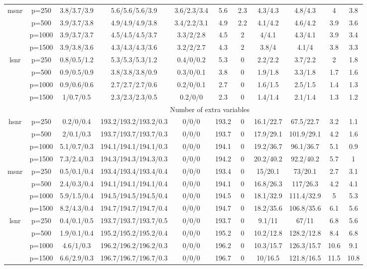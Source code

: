 \begin{table}[ht]
{\begin{tabular}{|c|c|ccccccccc|}
  \midrule\multirow{4}[2]{*}{msnr} & p=250 & 3.8/3.7/3.9 & 5.6/5.6/5.6/3.9 & 3.6/2.3/3.4 & 5.6 & 2.3 & 4.3/4.3 & 4.8/4.3 & 4 & 3.8 \\ 
   & p=500 & 3.9/3.7/3.8 & 4.9/4.9/4.9/3.8 & 3.4/2.2/3.1 & 4.9 & 2.2 & 4.1/4.2 & 4.6/4.2 & 3.9 & 3.6 \\ 
   & p=1000 & 3.9/3.7/3.7 & 4.5/4.5/4.5/3.7 & 3.3/2/2.8 & 4.5 & 2 & 4/4.1 & 4.3/4.1 & 3.9 & 3.4 \\ 
   & p=1500 & 3.9/3.8/3.6 & 4.3/4.3/4.3/3.6 & 3.2/2/2.7 & 4.3 & 2 & 3.8/4 & 4.1/4 & 3.8 & 3.3 \\ 
  \midrule\multirow{4}[2]{*}{lsnr} & p=250 & 0.8/0.5/1.2 & 5.3/5.3/5.3/1.2 & 0.4/0/0.2 & 5.3 & 0 & 2.2/2.2 & 3.7/2.2 & 2 & 1.8 \\ 
   & p=500 & 0.9/0.5/0.9 & 3.8/3.8/3.8/0.9 & 0.3/0/0.1 & 3.8 & 0 & 1.9/1.8 & 3.3/1.8 & 1.7 & 1.6 \\ 
   & p=1000 & 0.9/0.6/0.6 & 2.7/2.7/2.7/0.6 & 0.2/0/0.1 & 2.7 & 0 & 1.6/1.5 & 2.5/1.5 & 1.4 & 1.3 \\ 
   & p=1500 & 1/0.7/0.5 & 2.3/2.3/2.3/0.5 & 0.2/0/0 & 2.3 & 0 & 1.4/1.4 & 2.1/1.4 & 1.3 & 1.2 \\ 
   \midrule 
 \multicolumn{1}{|c}{} &       & \multicolumn{9}{c|}{Number of extra variables} \\
\midrule\multirow{4}[2]{*}{hsnr} & p=250 & 0.2/0/0.4 & 193.2/193.2/193.2/0.3 & 0/0/0 & 193.2 & 0 & 16.1/22.7 & 67.5/22.7 & 3.2 & 1.1 \\ 
   & p=500 & 2/0.1/0.3 & 193.7/193.7/193.7/0.3 & 0/0/0 & 193.7 & 0 & 17.9/29.1 & 101.9/29.1 & 4.2 & 1.6 \\ 
   & p=1000 & 5.1/0.7/0.3 & 194.1/194.1/194.1/0.3 & 0/0/0 & 194.1 & 0 & 19.2/36.7 & 96.1/36.7 & 5.1 & 0.9 \\ 
   & p=1500 & 7.3/2.4/0.3 & 194.3/194.3/194.3/0.3 & 0/0/0 & 194.2 & 0 & 20.2/40.2 & 92.2/40.2 & 5.7 & 1 \\ 
  \midrule\multirow{4}[2]{*}{msnr} & p=250 & 0.5/0.1/0.4 & 193.4/193.4/193.4/0.4 & 0/0/0 & 193.4 & 0 & 15/20.1 & 73/20.1 & 2.7 & 3.1 \\ 
   & p=500 & 2.4/0.3/0.4 & 194.1/194.1/194.1/0.4 & 0/0/0 & 194.1 & 0 & 16.8/26.3 & 117/26.3 & 4.2 & 4.1 \\ 
   & p=1000 & 5.9/1.5/0.4 & 194.5/194.5/194.5/0.4 & 0/0/0 & 194.5 & 0 & 18.1/32.9 & 111.4/32.9 & 5 & 5.3 \\ 
   & p=1500 & 8.2/4.3/0.4 & 194.7/194.7/194.7/0.4 & 0/0/0 & 194.7 & 0 & 18.2/35.6 & 106.8/35.6 & 6.1 & 5.6 \\ 
  \midrule\multirow{4}[2]{*}{lsnr} & p=250 & 0.4/0.1/0.5 & 193.7/193.7/193.7/0.5 & 0/0/0 & 193.7 & 0 & 9.1/11 & 67/11 & 6.8 & 5.6 \\ 
   & p=500 & 1.9/0.1/0.4 & 195.2/195.2/195.2/0.4 & 0/0/0 & 195.2 & 0 & 10.2/12.8 & 128.2/12.8 & 8.4 & 6.8 \\ 
   & p=1000 & 4.6/1/0.3 & 196.2/196.2/196.2/0.3 & 0/0/0 & 196.2 & 0 & 10.3/15.7 & 126.3/15.7 & 10.6 & 9.1 \\ 
   & p=1500 & 6.6/2.9/0.3 & 196.7/196.7/196.7/0.3 & 0/0/0 & 196.7 & 0 & 10/16.5 & 121.8/16.5 & 11.5 & 10.8 \\ 
   \bottomrule 
\end{tabular}
}
\end{table}
